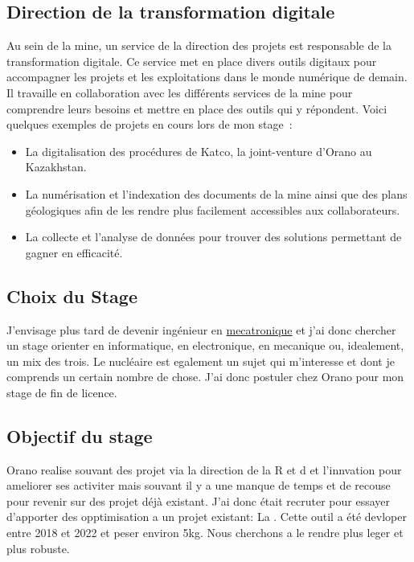 \subsection{Direction de la transformation digitale}
Au sein de la mine, un service de la direction des projets est responsable de la transformation digitale. Ce service met en place divers outils digitaux pour accompagner les projets et les exploitations dans le monde numérique de demain. Il travaille en collaboration avec les différents services de la mine pour comprendre leurs besoins et mettre en place des outils qui y répondent. Voici quelques exemples de projets en cours lors de mon stage~:



\begin{itemize}
    \item La digitalisation des procédures de Katco, la joint-venture d'Orano au Kazakhstan.
    \item La numérisation et l'indexation des documents de la mine ainsi que des plans géologiques afin de les rendre plus facilement accessibles aux collaborateurs.
    \item La collecte et l'analyse de données pour trouver des solutions permettant de gagner en efficacité.
\end{itemize}


\subsection{Choix du Stage}
J'envisage plus tard de devenir ingénieur en \href{https://fr.wikipedia.org/wiki/M%C3%A9catronique}{mecatronique} et j'ai donc chercher un stage orienter en informatique, en electronique, en mecanique ou, idealement, un mix des trois. Le nucléaire est egalement un sujet qui m'interesse et dont je comprends un certain nombre de chose. J'ai donc postuler chez Orano pour mon stage de fin de licence. %
\subsection{Objectif du stage}

Orano realise souvant des projet via la direction de la R et d et l'innvation pour ameliorer ses activiter mais souvant il y a une manque de temps et de recouse pour revenir sur des projet déjà existant. J'ai donc était recruter pour essayer d'apporter des opptimisation a un projet existant: La . Cette outil a été devloper entre 2018 et 2022 et peser environ 5kg. Nous cherchons a le rendre plus leger et plus robuste.